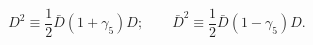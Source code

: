 \begin{equation}
D^2 \equiv \frac{1}{2} \bar D (1+\gamma_5)D;\qquad
\bar D^2 \equiv \frac{1}{2}\bar D (1-\gamma_5) D.
\end{equation}

